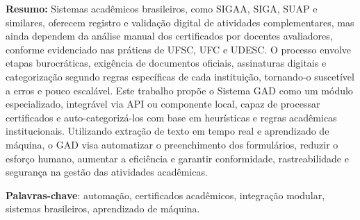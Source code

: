 \begin{resumo}

\textbf{Resumo:} Sistemas acadêmicos brasileiros, como SIGAA, SIGA, SUAP e similares, oferecem registro e validação digital de atividades complementares, mas ainda dependem da análise manual dos certificados por docentes avaliadores, conforme evidenciado nas práticas de UFSC, UFC e UDESC. O processo envolve etapas burocráticas, exigência de documentos oficiais, assinaturas digitais e categorização segundo regras específicas de cada instituição, tornando-o suscetível a erros e pouco escalável. Este trabalho propõe o Sistema GAD como um módulo especializado, integrável via API ou componente local, capaz de processar certificados e auto-categorizá-los com base em heurísticas e regras acadêmicas institucionais. Utilizando extração de texto em tempo real e aprendizado de máquina, o GAD visa automatizar o preenchimento dos formulários, reduzir o esforço humano, aumentar a eficiência e garantir conformidade, rastreabilidade e segurança na gestão das atividades acadêmicas.

\vspace{\onelineskip}

\textbf{Palavras-chave}: automação, certificados acadêmicos, integração modular, sistemas brasileiros, aprendizado de máquina.

\end{resumo}